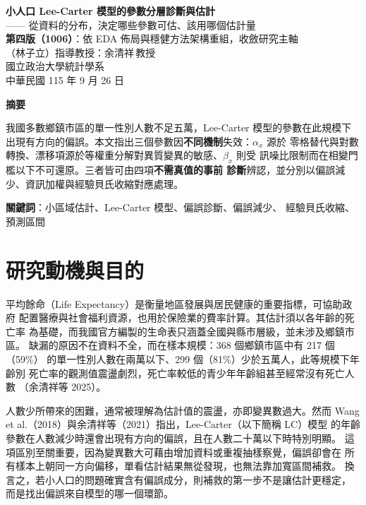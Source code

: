 \documentclass[UTF8, fontset=macnew, a4paper, 12pt]{ctexart}
\begin{document}
\begin{center}
{\bfseries 小人口 Lee-Carter 模型的參數分層診斷與估計}\\[4pt]
{ —— 從資料的分布，決定哪些參數可估、該用哪個估計量}\\[4pt]
{\textbf{第四版（1006）}：依 EDA 佈局與穩健方法架構重組，收斂研究主軸}\\[12pt]
{ （林子立）\quad 指導教授：余清祥\,教授}\\[4pt]
{ 國立政治大學統計學系}\\[4pt]
{ 中華民國 115 年 9 月 26 日}
\end{center}

\vspace{6pt}
\begin{center}
\begin{minipage}{0.92\textwidth}
\small
\textbf{摘要}\par\vspace{4pt}
我國多數鄉鎮市區的單一性別人數不足五萬，Lee-Carter 模型的參數在此規模下
出現有方向的偏誤。本文指出三個參數因\textbf{不同機制}失效：$\alpha_x$ 源於
零格替代與對數轉換、漂移項源於等權重分解對異質變異的敏感、$\beta_x$ 則受
訊噪比限制而在相變門檻以下不可還原。三者皆可由四項\textbf{不需真值的事前
診斷}辨認，並分別以偏誤減少、資訊加權與經驗貝氏收縮對應處理。\par\vspace{6pt}
\textbf{關鍵詞}：小區域估計、Lee-Carter 模型、偏誤診斷、偏誤減少、
經驗貝氏收縮、預測區間
\end{minipage}
\end{center}

\vspace{10pt}

\section{研究動機與目的}

平均餘命（Life Expectancy）是衡量地區發展與居民健康的重要指標，可協助政府
配置醫療與社會福利資源，也用於保險業的費率計算。其估計須以各年齡的死亡率
為基礎，而我國官方編製的生命表只涵蓋全國與縣市層級，並未涉及鄉鎮市區。
缺漏的原因不在資料不全，而在樣本規模：368 個鄉鎮市區中有 217 個（59\%）
的單一性別人數在兩萬以下、299 個（81\%）少於五萬人，此等規模下年齡別
死亡率的觀測值震盪劇烈，死亡率較低的青少年年齡組甚至經常沒有死亡人數
（余清祥等 2025）。

人數少所帶來的困難，通常被理解為估計值的震盪，亦即變異數過大。然而
Wang et al.（2018）與余清祥等（2021）指出，Lee-Carter（以下簡稱 LC）模型
的年齡參數在人數減少時還會出現有方向的偏誤，且在人數二十萬以下時特別明顯。
這項區別至關重要，因為變異數大可藉由增加資料或重複抽樣察覺，偏誤卻會在
所有樣本上朝同一方向偏移，單看估計結果無從發現，也無法靠加寬區間補救。
換言之，若小人口的問題確實含有偏誤成分，則補救的第一步不是讓估計更穩定，
而是找出偏誤來自模型的哪一個環節。
\end{document}
